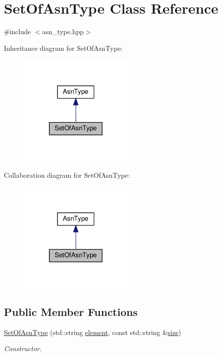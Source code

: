 \hypertarget{classSetOfAsnType}{}\section{Set\+Of\+Asn\+Type Class Reference}
\label{classSetOfAsnType}


{\ttfamily \#include $<$asn\+\_\+type.\+hpp$>$}



Inheritance diagram for Set\+Of\+Asn\+Type\+:
\nopagebreak
\begin{figure}[H]
\begin{center}
\leavevmode
\includegraphics[width=161pt]{dd/d06/classSetOfAsnType__inherit__graph}
\end{center}
\end{figure}


Collaboration diagram for Set\+Of\+Asn\+Type\+:
\nopagebreak
\begin{figure}[H]
\begin{center}
\leavevmode
\includegraphics[width=161pt]{d9/d4b/classSetOfAsnType__coll__graph}
\end{center}
\end{figure}
\subsection*{Public Member Functions}
\begin{DoxyCompactItemize}
\item 
\hyperlink{classSetOfAsnType_addf7371e0515c52c434e71c104a8c506}{Set\+Of\+Asn\+Type} (std\+::string \hyperlink{classSetOfAsnType_a615627490388391643a0ca1b70a46ecb}{element}, const std\+::string \&\hyperlink{classSetOfAsnType_a497aa01dd40b76c0e2d74e7b73727916}{size})
\begin{DoxyCompactList}\small\item\em Constructor. \end{DoxyCompactList}\end{DoxyCompactItemize}

